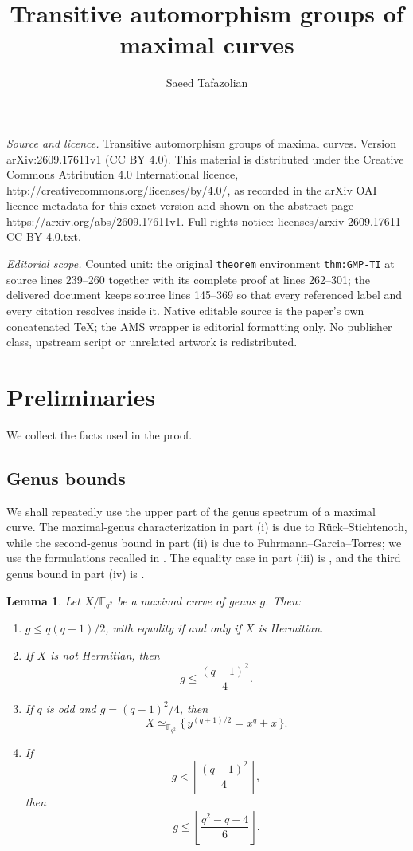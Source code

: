\documentclass[10pt,a4paper]{amsart}
\newtheorem{lemma}[theorem]{Lemma}
\newcommand{\F}{\mathbb F}
\begin{document}
\title[Transitive automorphism groups of maximal curves]{Transitive automorphism groups of maximal curves}
\author{Saeed Tafazolian}
\date{}
\maketitle
\noindent\emph{Source and licence.} Transitive automorphism groups of maximal curves. Version arXiv:2609.17611v1 (CC BY 4.0). This material is distributed under the Creative Commons Attribution 4.0 International licence, http://creativecommons.org/licenses/by/4.0/, as recorded in the arXiv OAI licence metadata for this exact version and shown on the abstract page https://arxiv.org/abs/2609.17611v1. Full rights notice: licenses/arxiv-2609.17611-CC-BY-4.0.txt.\par\smallskip
\noindent\textit{Editorial scope.} Counted unit: the original \texttt{theorem} environment \texttt{thm:GMP-TI} at source lines 239--260 together with its complete proof at lines 262--301; the delivered document keeps source lines 145--369 so that every referenced label and every citation resolves inside it. Native editable source is the paper's own concatenated TeX; the AMS wrapper is editorial formatting only. No publisher class, upstream script or unrelated artwork is redistributed.
\section{Preliminaries}

We collect the facts used in the proof.

\subsection{Genus bounds}

We shall repeatedly use the upper part of the genus spectrum of a
maximal curve.  The maximal-genus characterization in part \textup{(i)}
is due to R\"uck--Stichtenoth, while the second-genus bound in part
\textup{(ii)} is due to Fuhrmann--Garcia--Torres; we use the formulations
recalled in \cite[Lemma~2.12 and Corollary~2.13]{KT}.  The equality case
in part \textup{(iii)} is \cite[Theorem~3.1]{FGT}, and the third genus
bound in part \textup{(iv)} is \cite[Corollary~3.3]{KT}.

\begin{lemma}\label{lem:gaps}
Let $X/\F_{q^2}$ be a maximal curve of genus $g$.
Then:
\begin{enumerate}[label=\textup{(\roman*)}]
\item
$g\le q(q-1)/2$, with equality if and only if $X$ is Hermitian.

\item If $X$ is not Hermitian, then
\[
g\le \frac{(q-1)^2}{4}.
\]

\item If $q$ is odd and $g=(q-1)^2/4$, then
\[
X\simeq_{\F_{q^2}}\{\,y^{(q+1)/2}=x^q+x\,\}.
\]

\item If
\[
g<\left\lfloor\frac{(q-1)^2}{4}\right\rfloor,
\]
then
\[
g\le\left\lfloor\frac{q^2-q+4}{6}\right\rfloor.
\]
\end{enumerate}
\end{lemma}
\end{document}
